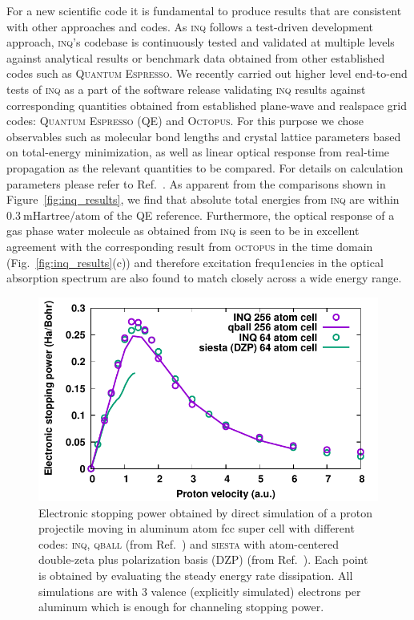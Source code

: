 For a new scientific code it is fundamental to produce results that are consistent with other approaches and codes. 
As \textsc{inq} follows a test-driven development approach, \textsc{inq}'s codebase is continuously tested and validated at multiple levels against analytical results or benchmark data obtained from other established codes such as \textsc{Quantum Espresso}. 
We recently carried out higher level end-to-end tests of \textsc{inq} as a part of the software release validating \textsc{inq} results against corresponding quantities obtained from established plane-wave and realspace grid codes: \textsc{Quantum Espresso} (QE) and \textsc{Octopus}. 
For this purpose we chose observables such as molecular bond lengths and crystal lattice parameters based on total-energy minimization, as well as linear optical response from real-time propagation as the relevant quantities to be compared. 
For details on calculation parameters please refer to Ref.~\cite{Andrade2021}. 
As apparent from the comparisons shown in Figure~\ref{fig:inq_results}, we find that absolute total energies from \textsc{inq} are within \(0.3~\mathrm{mHartree/atom}\) of the QE reference. 
Furthermore, the optical response of a gas phase water molecule as obtained from \textsc{inq} is seen to be in excellent agreement with the corresponding result from \textsc{octopus} in the time domain (Fig.~\ref{fig:inq_results}(c)) and therefore excitation frequ1encies in the optical absorption spectrum are also found to match closely across a wide energy range. 

\begin{figure}
	\centering
	\includegraphics[width=0.66\columnwidth]{figures/al_stopping}
	\caption{
		Electronic stopping power obtained by direct simulation of a proton projectile moving in aluminum atom fcc super cell with different codes: \textsc{inq}, \textsc{qball} (from Ref.~\cite{Schleife2015}) and \textsc{siesta} with atom-centered double-zeta plus polarization basis (DZP) (from Ref.~\cite{Correa2012}).
		Each point is obtained by evaluating the steady energy rate dissipation.
		All simulations are with 3 valence (explicitly simulated) electrons per aluminum which is enough for channeling stopping power.
	}
	\label{fig:al_stopping}
\end{figure}

